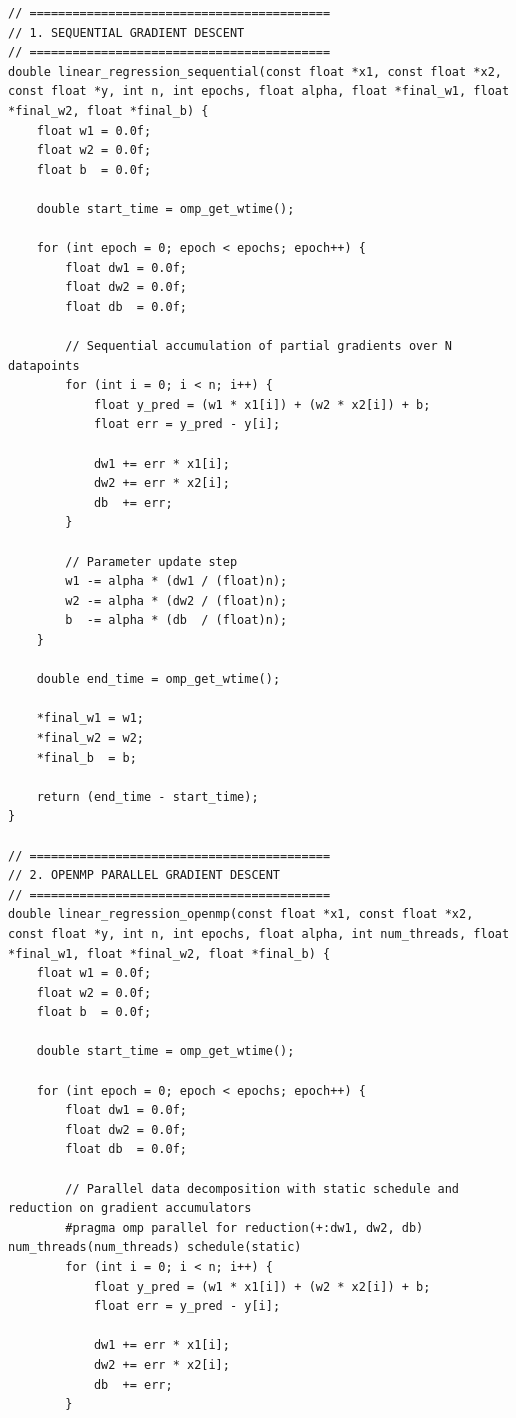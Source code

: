 \documentclass[12pt]{article}
\begin{document}
\begin{lstlisting}
// ==========================================
// 1. SEQUENTIAL GRADIENT DESCENT
// ==========================================
double linear_regression_sequential(const float *x1, const float *x2, const float *y, int n, int epochs, float alpha, float *final_w1, float *final_w2, float *final_b) {
    float w1 = 0.0f;
    float w2 = 0.0f;
    float b  = 0.0f;

    double start_time = omp_get_wtime();

    for (int epoch = 0; epoch < epochs; epoch++) {
        float dw1 = 0.0f;
        float dw2 = 0.0f;
        float db  = 0.0f;

        // Sequential accumulation of partial gradients over N datapoints
        for (int i = 0; i < n; i++) {
            float y_pred = (w1 * x1[i]) + (w2 * x2[i]) + b;
            float err = y_pred - y[i];

            dw1 += err * x1[i];
            dw2 += err * x2[i];
            db  += err;
        }

        // Parameter update step
        w1 -= alpha * (dw1 / (float)n);
        w2 -= alpha * (dw2 / (float)n);
        b  -= alpha * (db  / (float)n);
    }

    double end_time = omp_get_wtime();

    *final_w1 = w1;
    *final_w2 = w2;
    *final_b  = b;

    return (end_time - start_time);
}

// ==========================================
// 2. OPENMP PARALLEL GRADIENT DESCENT
// ==========================================
double linear_regression_openmp(const float *x1, const float *x2, const float *y, int n, int epochs, float alpha, int num_threads, float *final_w1, float *final_w2, float *final_b) {
    float w1 = 0.0f;
    float w2 = 0.0f;
    float b  = 0.0f;

    double start_time = omp_get_wtime();

    for (int epoch = 0; epoch < epochs; epoch++) {
        float dw1 = 0.0f;
        float dw2 = 0.0f;
        float db  = 0.0f;

        // Parallel data decomposition with static schedule and reduction on gradient accumulators
        #pragma omp parallel for reduction(+:dw1, dw2, db) num_threads(num_threads) schedule(static)
        for (int i = 0; i < n; i++) {
            float y_pred = (w1 * x1[i]) + (w2 * x2[i]) + b;
            float err = y_pred - y[i];

            dw1 += err * x1[i];
            dw2 += err * x2[i];
            db  += err;
        }


\end{lstlisting}
\end{document}
